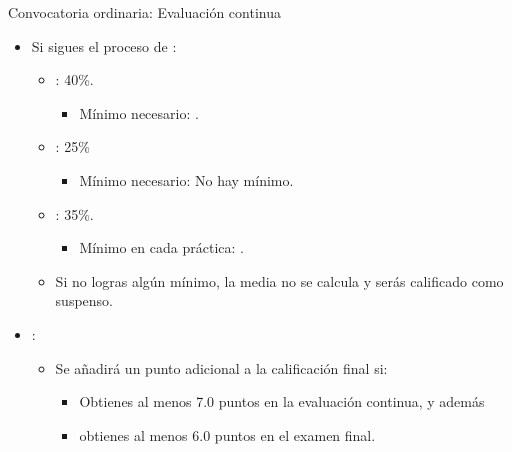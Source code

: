 \begin{frame}[t]{Convocatoria ordinaria: Evaluación continua}
\begin{itemize}
  \item Si sigues el proceso de :
    \begin{itemize}
    \item {}: 40\%.
      \begin{itemize}
        \item Mínimo necesario: .
      \end{itemize}
    \item {}: 25\%
      \begin{itemize}
        \item Mínimo necesario: \alert{No hay mínimo}.
      \end{itemize}
    \item {}: 35\%.
      \begin{itemize}
        \item Mínimo en cada práctica: .
      \end{itemize}
    \item Si no logras algún mínimo, la media no se calcula y serás calificado como suspenso.
  \end{itemize}

  \item {}:
    \begin{itemize}
      \item Se añadirá un punto adicional a la calificación final si:
        \begin{itemize}
          \item Obtienes al menos 7.0 puntos en la evaluación continua, y además
          \item obtienes al menos 6.0 puntos en el examen final.
        \end{itemize}
    \end{itemize}
\end{itemize}
\end{frame}

